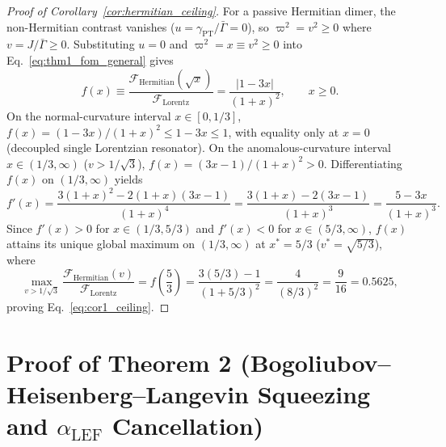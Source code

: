 \documentclass[11pt,letterpaper]{article}
\theoremstyle{definition}
\theoremstyle{remark}
\begin{document}
\begin{proof}[Proof of Corollary~\ref{cor:hermitian_ceiling}]
For a passive Hermitian dimer, the non-Hermitian contrast vanishes ($u = \gamma_{\mathrm{PT}}/\bar{\Gamma} = 0$), so $\varpi^2 = v^2 \ge 0$ where $v = J/\bar{\Gamma} \ge 0$. Substituting $u = 0$ and $\varpi^2 = x \equiv v^2 \ge 0$ into Eq.~\eqref{eq:thm1_fom_general} gives
\begin{equation}
f(x) \equiv \frac{\mathcal{F}_{\mathrm{Hermitian}}(\sqrt{x})}{\mathcal{F}_{\mathrm{Lorentz}}} = \frac{|1 - 3x|}{(1 + x)^2}, \qquad x \ge 0.
\label{eq:appB_fx}
\end{equation}
On the normal-curvature interval $x \in [0, 1/3]$, $f(x) = (1 - 3x)/(1 + x)^2 \le 1 - 3x \le 1$, with equality only at $x = 0$ (decoupled single Lorentzian resonator). On the anomalous-curvature interval $x \in (1/3, \infty)$ ($v > 1/\sqrt{3}$), $f(x) = (3x - 1)/(1 + x)^2 > 0$. Differentiating $f(x)$ on $(1/3, \infty)$ yields
\begin{equation}
f'(x) = \frac{3(1 + x)^2 - 2(1 + x)(3x - 1)}{(1 + x)^4} = \frac{3(1 + x) - 2(3x - 1)}{(1 + x)^3} = \frac{5 - 3x}{(1 + x)^3}.
\label{eq:appB_fprime}
\end{equation}
Since $f'(x) > 0$ for $x \in (1/3, 5/3)$ and $f'(x) < 0$ for $x \in (5/3, \infty)$, $f(x)$ attains its unique global maximum on $(1/3, \infty)$ at $x^* = 5/3$ ($v^* = \sqrt{5/3}$), where
\begin{equation}
\max_{v > 1/\sqrt{3}} \frac{\mathcal{F}_{\mathrm{Hermitian}}(v)}{\mathcal{F}_{\mathrm{Lorentz}}} = f\!\left(\frac{5}{3}\right) = \frac{3(5/3) - 1}{(1 + 5/3)^2} = \frac{4}{(8/3)^2} = \frac{9}{16} = 0.5625,
\label{eq:appB_max_val}
\end{equation}
proving Eq.~\eqref{eq:cor1_ceiling}.
\end{proof}

\section{Proof of Theorem 2 (Bogoliubov--Heisenberg--Langevin Squeezing and $\alpha_{\mathrm{LEF}}$ Cancellation)}
\label{app:proof_thm2}
\end{document}
